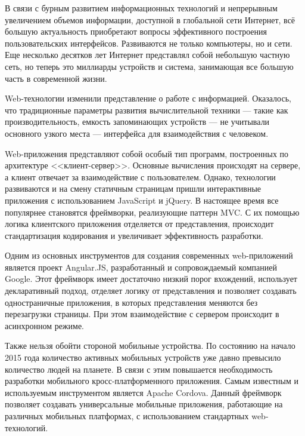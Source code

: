 В связи с бурным развитием информационных технологий и непрерывным увеличением объемов информации, доступной в глобальной сети Интернет, всё большую актуальность приобретают вопросы эффективного построения пользовательских интерфейсов. Развиваются не только компьютеры, но и сети. Еще несколько десятков лет Интернет представлял собой небольшую частную сеть, но теперь это миллиарды устройств и система, занимающая все большую часть в современной жизни.

Web-технологии изменили представление о работе с информацией. Оказалось, что традиционные параметры развития вычислительной техники --- такие как производительность, емкость запоминающих устройств --- не учитывали основного узкого места --- интерфейса для взаимодействия с человеком.

Web-приложения представляют собой особый тип программ, построенных по архитектуре <<клиент-сервер>>. Основные вычисления происходят на сервере, а клиент отвечает за взаимодействие с пользователем. Однако, технологии развиваются и на смену статичным страницам пришли интерактивные приложения с использованием JavaScript и jQuery. В настоящее время все популярнее становятся фреймворки, реализующие паттерн MVC. С их помощью логика клиентского приложения отделяется от представления, происходит стандартизация кодирования и увеличивает эффективность разработки.

Одним из основных инструментов для создания современных web-приложений является проект Angular.JS, разработанный и сопровождаемый компанией Google. Этот фреймворк имеет достаточно низкий порог вхождений, использует декларативный подход, отделяет логику от представления и позволяет создавать одностраничные приложения, в которых представления меняются без перезагрузки страницы. При этом взаимодействие с сервером происходит в асинхронном режиме.

Также нельзя обойти стороной мобильные устройства. По состоянию на начало 2015 года количество активных мобильных устройств уже давно превысило количество людей на планете\cite{mobile_count}. В связи с этим повышается необходимость разработки мобильного кросс-платформенного приложения. Самым известным и используемым инструментом является Apache Cordova\cite{cordova}. Данный фреймворк позволяет создавать универсальные мобильные приложения, работающие на различных мобильных платформах, с использованием стандартных web-технологий.

